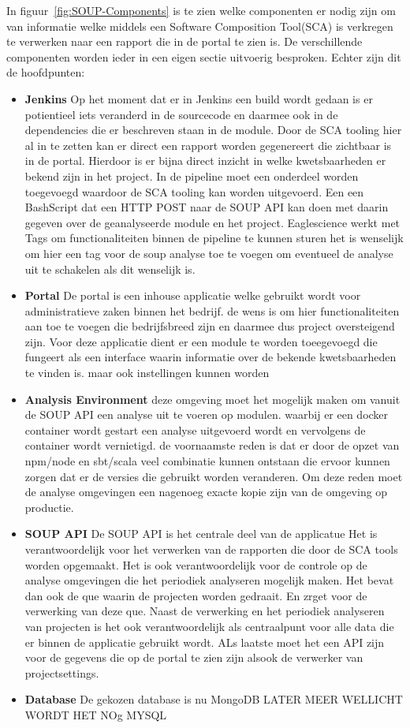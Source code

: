In figuur~\ref{fig:SOUP-Components} is te zien welke componenten er nodig zijn om van informatie welke middels een Software Composition Tool(SCA) is verkregen te verwerken naar een rapport die in de portal te zien is. De verschillende componenten worden ieder in een eigen sectie uitvoerig besproken.%
Echter zijn dit de hoofdpunten:
\begin{itemize}
    \item \textbf{Jenkins} Op het moment dat er in Jenkins een build wordt gedaan is er potientieel iets veranderd in de sourcecode en daarmee ook in de dependencies die er beschreven staan in de module. Door de SCA tooling hier al in te zetten kan er direct een rapport worden gegenereert die zichtbaar is in de portal. Hierdoor is er bijna direct inzicht in welke kwetsbaarheden er bekend zijn in het project. In de pipeline moet een onderdeel worden toegevoegd waardoor de SCA tooling kan worden uitgevoerd. Een een BashScript dat een HTTP POST naar de SOUP API kan doen met daarin gegeven over de geanalyseerde module en het project. Eaglescience werkt met Tags om functionaliteiten binnen de pipeline te kunnen sturen het is wenselijk om hier een tag voor de soup analyse toe te voegen om eventueel de analyse uit te schakelen als dit wenselijk is.
    \item \textbf{Portal} De portal is een inhouse applicatie welke gebruikt wordt voor administratieve zaken binnen het bedrijf. de wens is om hier functionaliteiten aan toe te voegen die bedrijfsbreed zijn en daarmee dus project oversteigend zijn. Voor deze applicatie dient er een module te worden toeegevoegd die fungeert als een interface waarin informatie over de bekende kwetsbaarheden te vinden is. maar ook instellingen kunnen worden
    \item \textbf{Analysis Environment} deze omgeving moet het mogelijk maken om vanuit de SOUP API een analyse uit te voeren op modulen. waarbij er een docker container wordt gestart een analyse uitgevoerd wordt en vervolgens de container wordt vernietigd. de voornaamste reden is dat er door de opzet van npm/node en sbt/scala veel combinatie kunnen ontstaan die ervoor kunnen zorgen dat er de versies die gebruikt worden veranderen. Om deze reden moet de analyse omgevingen een nagenoeg exacte kopie zijn van de omgeving op productie.
    \item \textbf{SOUP API} De SOUP API is het centrale deel van de applicatue Het is verantwoordelijk voor het verwerken van de rapporten die door de SCA tools worden opgemaakt. Het is ook verantwoordelijk voor de controle op de analyse omgevingen die het periodiek analyseren mogelijk maken. Het bevat dan ook de que waarin de projecten worden gedraait. En zrget voor de verwerking van deze que.
    Naast de verwerking en het periodiek analyseren van projecten is het ook verantwoordelijk als centraalpunt voor alle data die er binnen de applicatie gebruikt wordt. ALs laatste moet het een API zijn voor de gegevens die op de portal te zien zijn alsook de verwerker van projectsettings.
    \item \textbf{Database} De gekozen database is nu MongoDB LATER MEER WELLICHT WORDT HET NOg MYSQL
\end{itemize}


